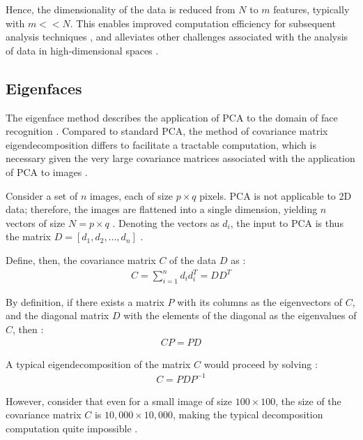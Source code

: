 Hence, the dimensionality of the data is reduced from $N$ to $m$ features, typically with $m$$<<$$N$. This enables improved computation efficiency for subsequent analysis techniques \cite{maaten_2007}, and alleviates other challenges associated with the analysis of data in high-dimensional spaces \cite{bellman_2010}.

\newpage
\subsection{Eigenfaces}

The eigenface method describes the application of PCA to the domain of face recognition \cite{lovell_2008}. Compared to standard PCA, the method of covariance matrix eigendecomposition differs to facilitate a tractable computation, which is necessary given the very large covariance matrices associated with the application of PCA to images \cite{lovell_2008}.

Consider a set of $n$ images, each of size $p\times q$ pixels. PCA is not applicable to 2D data; therefore, the images are flattened into a single dimension, yielding $n$ vectors of size $N=p\times q$ \cite{lovell_2008}. Denoting the vectors as $d_i$, the input to PCA is thus the matrix $D=[d_1, d_2, \ldots, d_n]$ \cite{lovell_2008}.

Define, then, the covariance matrix $C$ of the data $D$ as \cite{lovell_2008}:
\begin{align}
  C = \sum_{i=1}^n d_i d_i^T = DD^T
\end{align}

By definition, if there exists a matrix $P$ with its columns as the eigenvectors of $C$, and the diagonal matrix $D$ with the elements of the diagonal as the eigenvalues of $C$, then \cite{wolfram_2023}:
\begin{align}
  CP = PD
\end{align}

A typical eigendecomposition of the matrix $C$ would proceed by solving \cite{wolfram_2023}:
\begin{align}
  C = PDP^{-1}
\end{align}

However, consider that even for a small image of size $100\times100$, the size of the covariance matrix $C$ is $10,000\times10,000$, making the typical decomposition computation quite impossible \cite{lovell_2008}.

